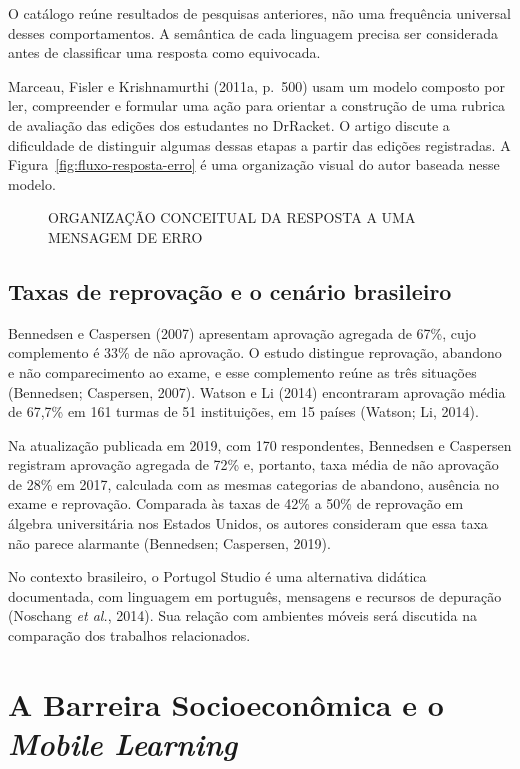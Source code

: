\documentclass[
    12pt
    ,oneside
    ,a4paper
    ,chapter=TITLE
    ,section=TITLE
    ,sumario=abnt-6027-2012]{abntex2}
\newcommand{\citeNoschang}{(Noschang \textit{et al.}, 2014)}
\newcommand{\citeBennedsen}{(Bennedsen; Caspersen, 2007)}
\newcommand{\citeBennedsenAtualizado}{(Bennedsen; Caspersen, 2019)}
\newcommand{\citeWatson}{(Watson; Li, 2014)}
\renewcommand{\legenda}[2][]{%
    \centering
    \caption[\MakeTextUppercase{#2}]{\maybeLabel{#1}\MakeTextUppercase{#2}}%
}
\begin{document}
O catálogo reúne resultados de pesquisas anteriores, não uma frequência universal
desses comportamentos. A semântica de cada linguagem precisa ser considerada antes
de classificar uma resposta como equivocada.

Marceau, Fisler e Krishnamurthi (2011a, p.~500) usam um modelo composto por ler,
compreender e formular uma ação para orientar a construção de uma rubrica de
avaliação das edições dos estudantes no DrRacket. O artigo discute a dificuldade
de distinguir algumas dessas etapas a partir das edições registradas. A
Figura~\ref{fig:fluxo-resposta-erro} é uma organização visual do autor baseada nesse modelo.

\begin{figure}[htbp]
\centering
\legenda[fig:fluxo-resposta-erro]{Organização conceitual da resposta a uma mensagem de erro}

\end{figure}
\subsection{Taxas de reprovação e o cenário brasileiro}

Bennedsen e Caspersen (2007) apresentam aprovação agregada de 67\%, cujo complemento
é 33\% de não aprovação. O estudo distingue reprovação, abandono e não comparecimento ao exame, e esse complemento reúne as três situações \citeBennedsen. Watson e Li (2014) encontraram aprovação média de
67,7\% em 161 turmas de 51 instituições, em 15 países \citeWatson.

Na atualização publicada em 2019, com 170 respondentes, Bennedsen e Caspersen
registram aprovação agregada de 72\% e, portanto, taxa média de não aprovação de
28\% em 2017, calculada com as mesmas categorias de abandono, ausência no exame e
reprovação. Comparada às taxas de 42\% a 50\% de reprovação em álgebra
universitária nos Estados Unidos, os autores consideram que essa taxa não parece
alarmante \citeBennedsenAtualizado.

 No contexto brasileiro,
o Portugol Studio é uma alternativa didática documentada, com linguagem em
português, mensagens e recursos de depuração \citeNoschang. Sua relação com
ambientes móveis será discutida na comparação dos trabalhos relacionados.
\section{A Barreira Socioeconômica e o \textit{Mobile Learning}}
\end{document}

